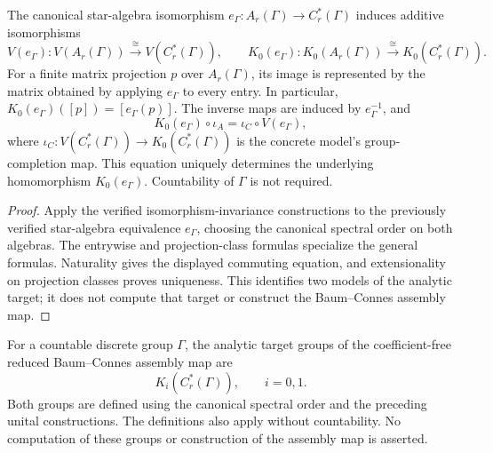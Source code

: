 \begin{proposition}\label{prop:abstract-concrete-k0}
The canonical star-algebra isomorphism
$e_\Gamma:A_r(\Gamma)\to C_r^*(\Gamma)$ induces additive isomorphisms
\[
 V(e_\Gamma):V(A_r(\Gamma))\xrightarrow{\;\cong\;}V(C_r^*(\Gamma)),
 \qquad
 K_0(e_\Gamma):K_0(A_r(\Gamma))\xrightarrow{\;\cong\;}K_0(C_r^*(\Gamma)).
\]
For a finite matrix projection $p$ over $A_r(\Gamma)$, its image is represented
by the matrix obtained by applying $e_\Gamma$ to every entry. In particular,
$K_0(e_\Gamma)([p])=[e_\Gamma(p)]$.
The inverse maps are induced by $e_\Gamma^{-1}$, and
\[
 K_0(e_\Gamma)\circ\iota_A=\iota_C\circ V(e_\Gamma),
\]
where $\iota_C:V(C_r^*(\Gamma))\to K_0(C_r^*(\Gamma))$ is the concrete
model's group-completion map. This equation uniquely determines the underlying
homomorphism $K_0(e_\Gamma)$. Countability of $\Gamma$ is not required.
\end{proposition}
\begin{proof}
\leanok
Apply the verified isomorphism-invariance constructions to the previously
verified star-algebra equivalence $e_\Gamma$, choosing the canonical spectral
order on both algebras. The entrywise and projection-class formulas specialize
the general formulas. Naturality gives the displayed commuting equation, and
extensionality on projection classes proves uniqueness.
This identifies two models of the analytic target; it does not compute that
target or construct the Baum--Connes assembly map.
\end{proof}

\begin{definition}\label{def:analytic-side}
\leanok
For a countable discrete group $\Gamma$, the analytic target groups of the
coefficient-free reduced Baum--Connes assembly map are
\[
 K_i(C_r^*(\Gamma)),\qquad i=0,1.
\]
Both groups are defined using the canonical spectral order and the preceding
unital constructions. The definitions also apply without countability.
No computation of these groups or construction of the assembly map is asserted.
\end{definition}

